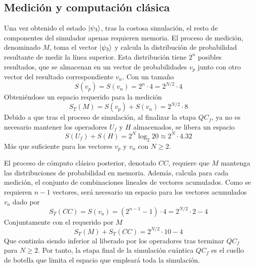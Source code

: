 \subsection{Medición y computación clásica}
Una vez obtenido el estado $\ket{\psi_{3}}$, tras la costosa simulación, el resto de 
componentes del simulador apenas requieren memoria.
El proceso de medición, denominado $M$, toma el vector $\ket{\psi_{3}}$ y calcula la 
distribución de probabilidad resultante de medir la línea superior. Esta 
distribución tiene $2^n$ posibles resultados, que se almacenan en un vector de 
probabilidades $v_p$ junto con otro vector del resultado correspondiente $v_n$.  
Con un tamaño
$$ S(v_p) = S(v_n) = 2^{n} \cdot 4 = 2^{N/2} \cdot 4 $$
Obteniéndose un espacio requerido para la medición
$$ S_T(M) = S(v_p) + S(v_n) = 2^{N/2} \cdot 8 $$
Debido a que tras el proceso de simulación, al finalizar la etapa $QC_f$, ya no 
es necesario mantener los operadores $U_f$ y $H$ almacenados, se libera un 
espacio
$$ S(U_f) + S(H) = 2^N \log_2 20 \approx 2^N \cdot 4.32$$
Más que suficiente para los vectores $v_p$ y $v_n$ con $N \geq 2$.

El proceso de cómputo clásico posterior, denotado $CC$, requiere que $M$ 
mantenga las distribuciones de probabilidad en memoria. Además, calcula para 
cada medición, el conjunto de combinaciones lineales de vectores acumulados.  
Como se requieren $n-1$ vectores, será necesario un espacio para los vectores 
acumulados $v_a$ dado por
$$ S_T(CC) = S(v_a) = (2^{n-1} - 1) \cdot 4 = 2^{N/2} \cdot 2 - 4$$
Conjuntamente con el requerido por $M$
$$ S_T(M) + S_T(CC) = 2^{N/2} \cdot 10 - 4 $$
Que continúa siendo inferior al liberado por los operadores tras terminar $QC_f$ 
para $N \geq 2$. Por tanto, la etapa final de la simulación cuántica $QC_f$ es 
el cuello de botella que limita el espacio que empleará toda la simulación.





